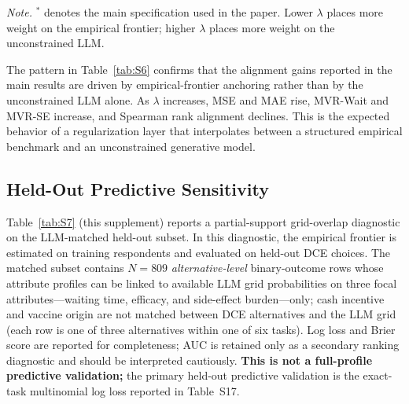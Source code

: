 \documentclass[11pt]{article}
\begin{document}
\begin{table}[htbp]
\vspace{0.3em}
\begin{minipage}{0.92\textwidth}
\small
\textit{Note.} \(^*\) denotes the main specification used in the paper. Lower \(\lambda\) places more weight on the empirical frontier; higher \(\lambda\) places more weight on the unconstrained LLM.
\end{minipage}
\end{table}

The pattern in Table~\ref{tab:S6} confirms that the alignment gains reported in the main results are driven by empirical-frontier anchoring rather than by the unconstrained LLM alone. As \(\lambda\) increases, MSE and MAE rise, MVR-Wait and MVR-SE increase, and Spearman rank alignment declines. This is the expected behavior of a regularization layer that interpolates between a structured empirical benchmark and an unconstrained generative model.

\subsection{Held-Out Predictive Sensitivity}
\label{app:lambda_heldout_sensitivity}

Table~\ref{tab:S7} (this supplement) reports a partial-support grid-overlap diagnostic on the LLM-matched held-out subset. In this diagnostic, the empirical frontier is estimated on training respondents and evaluated on held-out DCE choices. The matched subset contains \(N=809\) \emph{alternative-level} binary-outcome rows whose attribute profiles can be linked to available LLM grid probabilities on three focal attributes---waiting time, efficacy, and side-effect burden---only; cash incentive and vaccine origin are not matched between DCE alternatives and the LLM grid (each row is one of three alternatives within one of six tasks). Log loss and Brier score are reported for completeness; AUC is retained only as a secondary ranking diagnostic and should be interpreted cautiously. \textbf{This is not a full-profile predictive validation;} the primary held-out predictive validation is the exact-task multinomial log loss reported in Table~S17.
\end{document}
